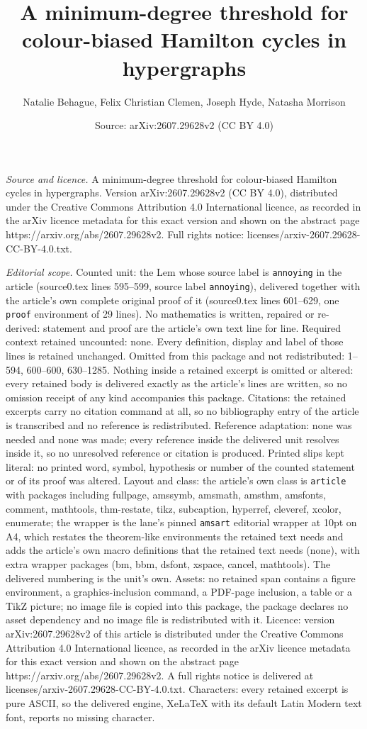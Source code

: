 \documentclass[10pt,a4paper]{amsart}
\title[A minimum-degree threshold for colour-biased Hamilton cycles]{A minimum-degree threshold for colour-biased Hamilton cycles in hypergraphs}
\author{Natalie Behague, Felix Christian Clemen, Joseph Hyde, Natasha Morrison}
\date{Source: arXiv:2607.29628v2 (CC BY 4.0)}
\begin{document}
\maketitle

\noindent\emph{Source and licence.} A minimum-degree threshold for colour-biased Hamilton cycles in hypergraphs. Version arXiv:2607.29628v2 (CC BY 4.0), distributed under the Creative Commons Attribution 4.0 International licence, as recorded in the arXiv licence metadata for this exact version and shown on the abstract page https://arxiv.org/abs/2607.29628v2. Full rights notice: licenses/arxiv-2607.29628-CC-BY-4.0.txt.\par\smallskip

\noindent\textit{Editorial scope.} Counted unit: the Lem whose source label is \texttt{annoying} in the article (source0.tex lines 595--599, source label \texttt{annoying}), delivered together with the article's own complete original proof of it (source0.tex lines 601--629, one \texttt{proof} environment of 29 lines). No mathematics is written, repaired or re-derived: statement and proof are the article's own text line for line. Required context retained uncounted: none. Every definition, display and label of those lines is retained unchanged. Omitted from this package and not redistributed: 1--594, 600--600, 630--1285. Nothing inside a retained excerpt is omitted or altered: every retained body is delivered exactly as the article's lines are written, so no omission receipt of any kind accompanies this package. Citations: the retained excerpts carry no citation command at all, so no bibliography entry of the article is transcribed and no reference is redistributed. Reference adaptation: none was needed and none was made; every reference inside the delivered unit resolves inside it, so no unresolved reference or citation is produced. Printed slips kept literal: no printed word, symbol, hypothesis or number of the counted statement or of its proof was altered. Layout and class: the article's own class is \texttt{article} with packages including fullpage, amssymb, amsmath, amsthm, amsfonts, comment, mathtools, thm-restate, tikz, subcaption, hyperref, cleveref, xcolor, enumerate; the wrapper is the lane's pinned \texttt{amsart} editorial wrapper at 10pt on A4, which restates the theorem-like environments the retained text needs and adds the article's own macro definitions that the retained text needs (none), with extra wrapper packages (bm, bbm, dsfont, xspace, cancel, mathtools). The delivered numbering is the unit's own. Assets: no retained span contains a figure environment, a graphics-inclusion command, a PDF-page inclusion, a table or a TikZ picture; no image file is copied into this package, the package declares no asset dependency and no image file is redistributed with it. Licence: version arXiv:2607.29628v2 of this article is distributed under the Creative Commons Attribution 4.0 International licence, as recorded in the arXiv licence metadata for this exact version and shown on the abstract page https://arxiv.org/abs/2607.29628v2. A full rights notice is delivered at licenses/arxiv-2607.29628-CC-BY-4.0.txt. Characters: every retained excerpt is pure ASCII, so the delivered engine, XeLaTeX with its default Latin Modern text font, reports no missing character.
\end{document}
